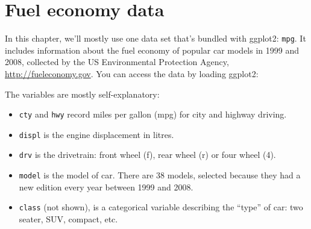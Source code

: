 \hypertarget{sec:fuel-economy-data}{\section{Fuel economy
data}\label{sec:fuel-economy-data}}

In this chapter, we'll mostly use one data set that's bundled with
ggplot2: \texttt{mpg}. It includes information about the fuel economy of
popular car models in 1999 and 2008, collected by the US Environmental
Protection Agency, \url{http://fueleconomy.gov}. You can access the data
by loading ggplot2: 

\begin{Shaded}
\begin{Highlighting}[]
\CommentTok{#> }
\end{Highlighting}
\end{Shaded}

The variables are mostly self-explanatory:

\begin{itemize}
\item
  \texttt{cty} and \texttt{hwy} record miles per gallon (mpg) for city
  and highway driving.
\item
  \texttt{displ} is the engine displacement in litres.
\item
  \texttt{drv} is the drivetrain: front wheel (f), rear wheel (r) or
  four wheel (4).
\item
  \texttt{model} is the model of car. There are 38 models, selected
  because they had a new edition every year between 1999 and 2008.
\item
  \texttt{class} (not shown), is a categorical variable describing the
  ``type'' of car: two seater, SUV, compact, etc.
\end{itemize}

